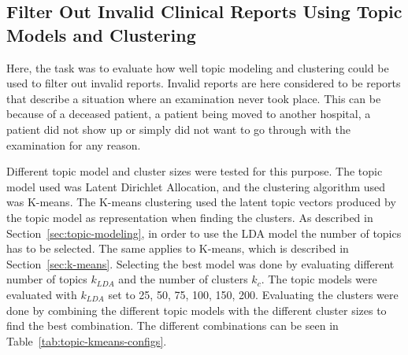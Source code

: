 \subsection{Filter Out Invalid Clinical Reports Using Topic Models and Clustering}

Here, the task was to evaluate how well topic modeling and clustering could be used to filter out invalid reports.
Invalid reports are here considered to be reports that describe a situation where an examination never took place.
This can be because of a deceased patient, a patient being moved to another hospital, a patient did not show up or simply did not want to go through with the examination for any reason.

Different topic model and cluster sizes were tested for this purpose.
The topic model used was Latent Dirichlet Allocation, and the clustering algorithm used was K-means.
The K-means clustering used the latent topic vectors produced by the topic model as representation when finding the clusters.
As described in Section~\ref{sec:topic-modeling}, in order to use the LDA model the number of topics has to be selected.
The same applies to K-means, which is described in Section~\ref{sec:k-means}.
Selecting the best model was done by evaluating different number of topics $k_{LDA}$ and the number of clusters $k_{c}$.
The topic models were evaluated with $k_{LDA}$ set to 25, 50, 75, 100, 150, 200.
Evaluating the clusters were done by combining the different topic models with the different cluster sizes to find the best combination.
The different combinations can be seen in Table~\ref{tab:topic-kmeans-configs}.
